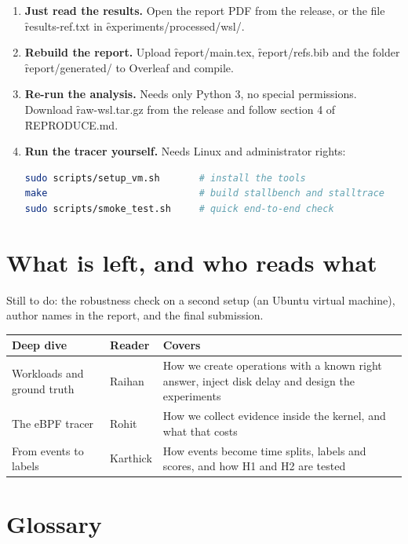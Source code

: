 \documentclass[11pt]{article}
\begin{document}
\begin{enumerate}
\item \textbf{Just read the results.} Open the report PDF from the release, or the file \f{results-ref.txt} in \f{experiments/processed/wsl/}.
\item \textbf{Rebuild the report.} Upload \f{report/main.tex}, \f{report/refs.bib} and the folder \f{report/generated/} to Overleaf and compile.
\item \textbf{Re-run the analysis.} Needs only Python 3, no special permissions. Download \f{raw-wsl.tar.gz} from the release and follow section 4 of \f{REPRODUCE.md}.
\item \textbf{Run the tracer yourself.} Needs Linux and administrator rights:
\begin{lstlisting}[language=bash]
sudo scripts/setup_vm.sh       # install the tools
make                           # build stallbench and stalltrace
sudo scripts/smoke_test.sh     # quick end-to-end check
\end{lstlisting}
\end{enumerate}

\section{What is left, and who reads what}

Still to do: the robustness check on a second setup (an Ubuntu virtual machine), author names in the report, and the final submission.

\begin{center}
\begin{tabularx}{\textwidth}{@{}llY@{}}
\toprule
Deep dive & Reader & Covers \\
\midrule
Workloads and ground truth & Raihan & How we create operations with a known right answer, inject disk delay and design the experiments \\
The eBPF tracer & Rohit & How we collect evidence inside the kernel, and what that costs \\
From events to labels & Karthick & How events become time splits, labels and scores, and how H1 and H2 are tested \\
\bottomrule
\end{tabularx}
\end{center}

\section{Glossary}
\end{document}
